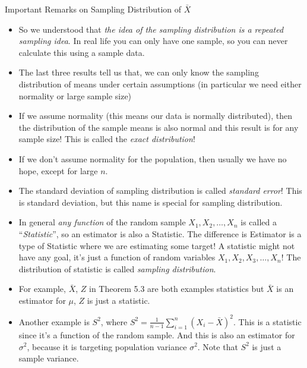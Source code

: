 \documentclass[8pt, usepdftitle=false]{beamer}
\begin{document}
\begin{frame}[allowframebreaks]{Important Remarks on Sampling Distribution of $\bar{X}$}

  
\begin{itemize}
  \item So we understood that \emph{the idea of the sampling distribution is a repeated sampling idea}. In real life you can only have one sample, so you can never calculate this using a sample data.

  \item The last three results tell us that, we can only know the sampling distribution of means under certain assumptions (in particular we need either normality or large sample size)

  \item If we assume normality (this means our data is normally distributed), then the distribution of the sample means is also normal and this result is for any sample size! This is called the \emph{exact distribution}!

  \item If we don't assume normality for the population, then usually we have no hope, except for large $n$.
  
  \item The standard deviation of sampling distribution is called \emph{standard error}! This is standard deviation, but this name is special for sampling distribution.


  \item In general \emph{any function} of the random sample $X_1, X_2, \ldots, X_n$ is called a ``\emph{Statistic}'', so an estimator is also a \alert{Statistic}. The difference is Estimator is a type of Statistic where we are estimating some target! A statistic might not have any goal, it's just a function of random variables $X_1, X_2, X_3, \ldots, X_n$! The distribution of statistic is called \emph{sampling distribution}. 

  \item For example, $\bar{X}$, $Z$ in Theorem 5.3 are both examples statistics but $\bar{X}$ is an estimator for $\mu$, $Z $ is just a statistic.

  \item Another example is $S^2$, where $S^2=\frac{1}{n-1} \sum_{i=1}^n\left(X_i-\bar{X}\right)^2$. This is  a statistic since it's a function of the random sample. And this is also an estimator for $\sigma^2$, because it is targeting population variance $\sigma^2$. Note that $S^2$ is just a sample variance.




\end{itemize}

\end{frame}
\end{document}
